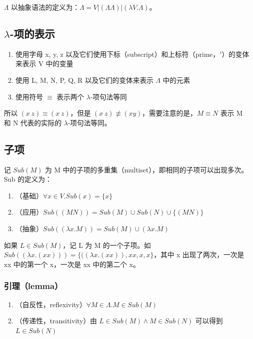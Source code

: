 \documentclass[UTF8]{article}
\begin{document}
	$\Lambda$ 以抽象语法的定义为：$\Lambda = V|(\Lambda\Lambda)|(\lambda V.\Lambda)$。
	
\subsection{$\lambda$-项的表示}

	\begin{enumerate}
		\item 使用字母 x, y, z 以及它们使用下标（subscript）和上标符（prime，$\prime$）的变体来表示 V 中的变量
		\item 使用 L, M, N, P, Q, R 以及它们的变体来表示 $\Lambda$ 中的元素
		\item 使用符号 $\equiv$ 表示两个 $\lambda$-项句法等同
	\end{enumerate}

	所以 $(x\ z) \equiv (x\ z)$，但是 $(x\ z) \not \equiv (x y)$，需要注意的是，$M \equiv N$ 表示 M 和 N 代表的实际的 $\lambda$-项句法等同。
	
\subsection{子项}

	记 $Sub(M)$ 为 M 中的子项的多重集（multiset），即相同的子项可以出现多次。Sub 的定义为：
	
	\begin{enumerate}
		\item （基础）$\forall x \in V. Sub(x) = \{x\}$
		\item （应用）$Sub((M N)) = Sub(M) \cup Sub(N) \cup \{(MN)\}$
		\item （抽象）$Sub((\lambda x.M)) = Sub(M) \cup {(\lambda x.M)}$
	\end{enumerate}
	
	如果 $L \in Sub(M)$，记 L 为 M 的一个子项。如 $Sub((\lambda x. (xx))) = \{((\lambda x. (xx)), xx, x, x\}$，其中 x 出现了两次，一次是 xx 中的第一个 x，一次是 xx 中的第二个 x。

\subsubsection{引理（lemma）}

	\begin{enumerate}
		\item （自反性，reflexivity）$\forall M \in \Lambda. M \in Sub(M)$
		\item （传递性，transitivity）由 ${L \in Sub(M)} \land {M \in Sub(N)}$ 可以得到 $L \in Sub(N)$
	\end{enumerate}
\end{document}

